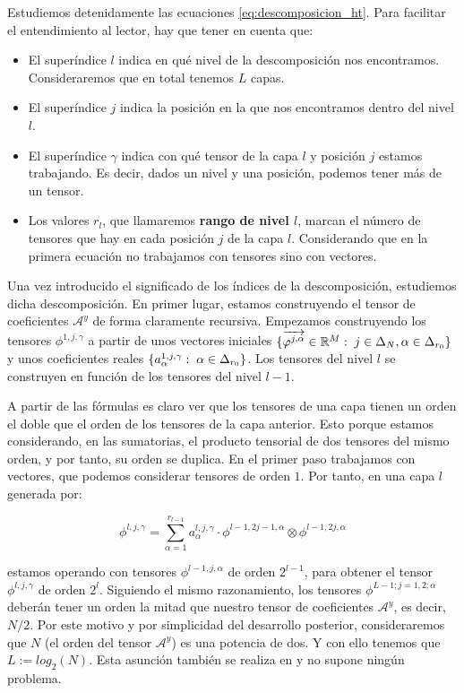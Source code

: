 Estudiemos detenidamente las ecuaciones \eqref{eq:descomposicion_ht}. Para facilitar el entendimiento al lector, hay que tener en cuenta que:

\begin{itemize}
	\item El superíndice $l$ indica en qué nivel de la descomposición nos encontramos. Consideraremos que en total tenemos $L$ capas.
	\item El superíndice $j$ indica la posición en la que nos encontramos dentro del nivel $l$.
	\item El superíndice $\gamma$ indica con qué tensor de la capa $l$ y posición $j$ estamos trabajando. Es decir, dados un nivel y una posición, podemos tener más de un tensor.
	\item Los valores $r_l$, que llamaremos \textbf{rango de nivel $l$}, marcan el número de tensores que hay en cada posición $j$ de la capa $l$. Considerando que en la primera ecuación no trabajamos con tensores sino con vectores.
\end{itemize}

Una vez introducido el significado de los índices de la descomposición, estudiemos dicha descomposición. En primer lugar, estamos construyendo el tensor de coeficientes $\mathcal{A}^y$ de forma claramente recursiva. Empezamos construyendo los tensores $\phi^{1, j, \gamma}$ a partir de unos vectores iniciales $\{\overrightarrow{\varphi^{j, \alpha}} \in \mathbb{R}^M: \; j \in \Delta_{N}, \alpha \in \Delta_{r_0}  \}$  y unos coeficientes reales $\{a_{\alpha}^{1, j, \gamma}: \; \alpha \in \Delta_{r_0}\}$. Los tensores del nivel $l$ se construyen en función de los tensores del nivel $l-1$.

A partir de las fórmulas es claro ver que los tensores de una capa tienen un orden el doble que el orden de los tensores de la capa anterior. Esto porque estamos considerando, en las sumatorias, el producto tensorial de dos tensores del mismo orden, y por tanto, su orden se duplica. En el primer paso trabajamos con vectores, que podemos considerar tensores de orden $1$. Por tanto, en una capa $l$ generada por:

\begin{equation}
	\phi^{l, j, \gamma} = \sum_{\alpha = 1}^{r_{l-1}} a_{\alpha}^{l, j, \gamma} \cdot \phi^{l-1, 2j-1, \alpha} \otimes \phi^{l-1, 2j, \alpha}
\end{equation}

estamos operando con tensores $\phi^{l-1, j, \alpha}$ de orden $2^{l-1}$, para obtener el tensor $\phi^{l, j, \gamma}$ de orden $2^l$. Siguiendo el mismo razonamiento, los tensores $\phi^{L-1; j = 1, 2; \alpha}$ deberán tener un orden la mitad que nuestro tensor de coeficientes $\mathcal{A}^y$, es decir, $N / 2$. Por este motivo y por simplicidad del desarrollo posterior, consideraremos que $N$ (el orden del tensor $\mathcal{A}^y$) es una potencia de dos. Y con ello tenemos que $L := log_2(N)$. Esta asunción también se realiza en \cite{matematicas:descomposicion_ht} y no supone ningún problema.

